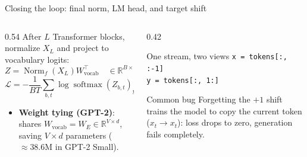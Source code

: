 \documentclass[handout]{beamer}
\begin{document}
\begin{frame}{Closing the loop: final norm, LM head, and target shift}
  \begin{columns}[c]
    \begin{column}{0.54\linewidth}
      After $L$ Transformer blocks, normalize $X_L$ and project to vocabulary logits:
      \[
        Z = \operatorname{Norm}_f(X_L)W_{\text{vocab}}^\top
        \quad\in\mathbb{R}^{B\times T\times V}
      \]
      \[
        \mathcal{L}=-\frac{1}{BT}\sum_{b,t}
        \log \operatorname{softmax}(Z_{b,t})_{y_{b,t}}
      \]
      \begin{itemize}
          \setlength{\itemsep}{4pt}
          \footnotesize
        \item \textbf{Weight tying (GPT-2)}: shares $W_{\text{vocab}} = W_E \in \mathbb{R}^{V \times d}$, saving $V \times d$ parameters ($\approx 38.6\text{M}$ in GPT-2 Small).
      \end{itemize}
    \end{column}
    \begin{column}{0.42\linewidth}
      \begin{block}{One stream, two views}
        \texttt{x = tokens[:, :-1]}\\[4pt]
        \texttt{y = tokens[:, 1:]}
      \end{block}
      \begin{alertblock}{Common bug}
        Forgetting the $+1$ shift trains the model to copy the current token ($x_t \to x_t$): loss drops to zero, generation fails completely.
      \end{alertblock}
    \end{column}
  \end{columns}
\end{frame}
\end{document}
